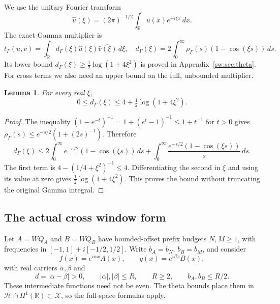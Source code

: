 \documentclass[11pt,a4paper]{article}
\numberwithin{equation}{section}
\newtheorem{lemma}[theorem]{Lemma}
\theoremstyle{definition}\newtheorem{definition}[theorem]{Definition}
\theoremstyle{remark}\newtheorem{remark}[theorem]{Remark}
\newcommand{\R}{\mathbb R}\newcommand{\C}{\mathbb C}\newcommand{\N}{\mathbb N}
\newcommand{\tg}{t_\Gamma}\newcommand{\cg}{c_\Gamma}
\begin{document}
We use the unitary Fourier transform
\begin{equation}\label{sw:eq:fourier}
 \widehat u(\xi)=(2\pi)^{-1/2}\int_\R u(x)e^{-i\xi x}\,dx.
\end{equation}
The exact Gamma multiplier is
\begin{equation}\label{sw:eq:gamma-symbol}
 \tg(u,v)=\int_\R d_\Gamma(\xi)\widehat u(\xi)
                  \overline{\widehat v(\xi)}\,d\xi,
 \quad d_\Gamma(\xi)=2\int_0^\infty\rho_\Gamma(s)(1-\cos(\xi s))\,ds.
\end{equation}
Its lower bound $d_\Gamma(\xi)\ge\frac12\log(1+4\xi^2)$ is proved in Appendix~\ref{sw:sec:theta}. For cross terms we also need an upper bound on the full, unbounded multiplier.

\begin{lemma}\label{sw:lem:gamma-upper}
For every real $\xi$,
\begin{equation}\label{sw:eq:gamma-upper}
 0\le d_\Gamma(\xi)\le4+\tfrac12\log(1+4\xi^2).
\end{equation}
\end{lemma}
\begin{proof}
The inequality $(1-e^{-t})^{-1}=1+(e^t-1)^{-1}\le1+t^{-1}$ for $t>0$ gives
$\rho_\Gamma(s)\le e^{-s/2}(1+(2s)^{-1})$. Therefore
\[
 d_\Gamma(\xi)\le
 2\int_0^\infty e^{-s/2}(1-\cos(\xi s))\,ds
 +\int_0^\infty\frac{e^{-s/2}(1-\cos(\xi s))}{s}\,ds.
\]
The first term is $4-(1/4+\xi^2)^{-1}\le4$. Differentiating the second in $\xi$ and using its value at zero gives $\frac12\log(1+4\xi^2)$. This proves the bound without truncating the original Gamma integral.
\end{proof}

\subsection{The actual cross window form}\label{sw:sec:cross}
Let $A=WQ_A$ and $B=WQ_B$ have bounded-offset prefix budgets $N,M\ge1$, with frequencies in $[-1,1]+i[-1/2,1/2]$. Write $b_A=b_N$, $b_B=b_M$, and consider
\[
 f(x)=e^{i\alpha x}A(x),\qquad g(x)=e^{i\beta x}B(x),
\]
with real carriers $\alpha,\beta$ and
\begin{equation}\label{sw:eq:cross-hyp}
 d=|\alpha-\beta|>0,\qquad |\alpha|,|\beta|\le R,
 \qquad R\ge2,\qquad b_A,b_B\le R/2.
\end{equation}
These intermediate functions need not be even. The theta bounds place them in $\mathscr H\cap H^1(\R)\subset\mathscr X$, so the full-space formulas apply.
\end{document}
